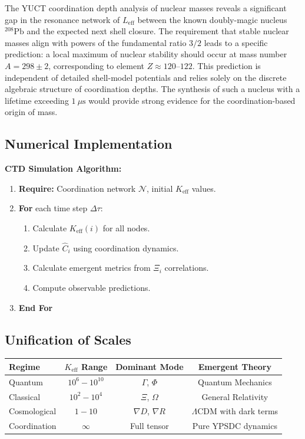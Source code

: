 \documentclass[11pt,a4paper]{article}
\begin{document}
The YUCT coordination depth analysis of nuclear masses reveals a significant gap in the resonance network of $L_{\mathrm{eff}}$ between the known doubly-magic nucleus $^{208}\mathrm{Pb}$ and the expected next shell closure. The requirement that stable nuclear masses align with powers of the fundamental ratio $3/2$ leads to a specific prediction: a local maximum of nuclear stability should occur at mass number $A = 298 \pm 2$, corresponding to element $Z \approx 120$--$122$. This prediction is independent of detailed shell-model potentials and relies solely on the discrete algebraic structure of coordination depths. The synthesis of such a nucleus with a lifetime exceeding $1\ \mu\text{s}$ would provide strong evidence for the coordination-based origin of mass.

\subsection{Numerical Implementation}

\textbf{CTD Simulation Algorithm:}
\begin{enumerate}
	\item \textbf{Require:} Coordination network $\mathcal{N}$, initial $K_{\mathrm{eff}}$ values.
	\item \textbf{For} each time step $\Delta\tau$:
	\begin{enumerate}
		\item Calculate $K_{\mathrm{eff}}(i)$ for all nodes.
		\item Update $\hat{C}_i$ using coordination dynamics.
		\item Calculate emergent metrics from $\Xi_i$ correlations.
		\item Compute observable predictions.
	\end{enumerate}
	\item \textbf{End For}
\end{enumerate}

\subsection{Unification of Scales}

\begin{table}[htbp]
	\centering
	\begin{tabular}{lccc}
		\toprule
		\textbf{Regime} & \textbf{$K_{\mathrm{eff}}$ Range} & \textbf{Dominant Mode} & \textbf{Emergent Theory} \\
		\midrule
		Quantum & $10^6-10^{10}$ & $\Gamma$, $\Phi$ & Quantum Mechanics \\
		Classical & $10^2-10^4$ & $\Xi$, $\Omega$ & General Relativity \\
		Cosmological & $1-10$ & $\nabla D$, $\nabla R$ & $\Lambda$CDM with dark terms \\
		Coordination & $\infty$ & Full tensor & Pure YPSDC dynamics \\
		\bottomrule
	\end{tabular}
\end{table}
\end{document}
